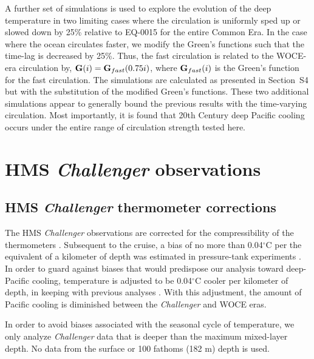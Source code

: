 \documentclass[12pt]{article}
\begin{document}
A further set of simulations is used to explore the evolution of the
deep temperature in two limiting cases where the circulation is
uniformly sped up or slowed down by 25\% relative to EQ-0015 for the
entire Common Era. In the case where the ocean circulates faster, we
modify the Green's functions such that the time-lag is decreased by
25\%. Thus, the fast circulation is related to the WOCE-era
circulation by, ${\bf G}(i) = {\bf G}_{fast}(0.75 i)$, where
${\bf G}_{fast}(i)$ is the Green's function for the fast
circulation. The simulations are calculated as presented in Section~S4
but with the substitution of the modified Green's functions. These two
additional simulations appear to generally bound the previous results
with the time-varying circulation. Most importantly, it is found that
20th Century deep Pacific cooling occurs under the entire range of
circulation strength tested here.

\section{HMS {\it Challenger} observations}
\label{sec:basinwideaverage}



\subsection{HMS {\it Challenger} thermometer corrections}

The HMS {\it Challenger} observations are corrected for the compressibility of the thermometers \cite{Tait--1882:Pressure}. Subsequent to the cruise, a bias of no more than 0.04$^\circ$C per the equivalent of a kilometer of depth was estimated in pressure-tank experiments \cite{Tait--1882:Pressure}. In order to guard against biases that would predispose our analysis toward deep-Pacific cooling, temperature is adjusted to be 0.04$^\circ$C cooler per kilometer of depth, in keeping with previous analyses \cite{Roemmich-Gould-2012:135}. With this adjustment, the amount of Pacific cooling is diminished between the {\it Challenger} and WOCE eras.

In order to avoid biases associated with the seasonal cycle of temperature, we only analyze {\it Challenger} data that is deeper than the maximum mixed-layer depth. No data from the surface or 100 fathoms (182 m) depth is used. 
\end{document}

